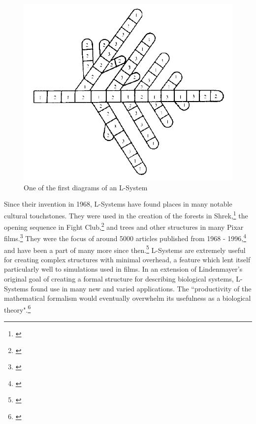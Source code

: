 \documentclass[12pt,twoside]{reedthesis}
\begin{document}
	\begin{figure}[h]
	\centering
	\includegraphics[height = 0.4\linewidth]{Images/OGLSystem}
	\caption{One of the first diagrams of an L-System}
	\label{OGLSystem}
	\end{figure}
	
	Since their invention in 1968, L-Systems have found places in many notable cultural touchstones. They were used in the creation of the forests in Shrek,\footnote{\cite{shrek2001}} the opening sequence in Fight Club,\footnote{\cite{FightClub1999}} and trees and other structures in many Pixar films.\footnote{\cite{theory2004}} They were the focus of around 5000 articles published from 1968 - 1996,\footnote{\cite{theory2004}} and have been a part of many more since then.\footnote{\cite{manyPapers}} L-Systems are extremely useful for creating complex structures with minimal overhead, a feature which lent itself particularly well to simulations used in films. In an extension of Lindenmayer's original goal of creating a formal structure for describing biological systems, L-Systems found use in many new and varied applications. The ``productivity of the mathematical formalism would eventually overwhelm its usefulness as a biological theory".\footnote{\cite{theory2004}}\\
	
	
	
	
\end{document}
